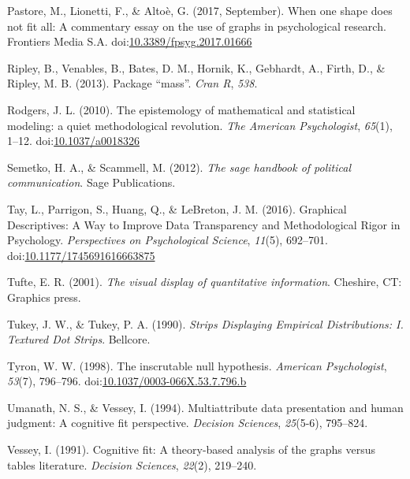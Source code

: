 \documentclass[
  man]{apa6}
\newlength{\cslhangindent}
\newenvironment{cslreferences}%
  {\setlength{\parindent}{0pt}%
  \everypar{\setlength{\hangindent}{\cslhangindent}}\ignorespaces}%
  {\par}
\begin{document}
\begin{cslreferences}
\leavevmode\hypertarget{ref-Pastore2017}{}%
Pastore, M., Lionetti, F., \& Altoè, G. (2017, September). When one shape does not fit all: A commentary essay on the use of graphs in psychological research. Frontiers Media S.A. doi:\href{https://doi.org/10.3389/fpsyg.2017.01666}{10.3389/fpsyg.2017.01666}

\leavevmode\hypertarget{ref-ripley2013package}{}%
Ripley, B., Venables, B., Bates, D. M., Hornik, K., Gebhardt, A., Firth, D., \& Ripley, M. B. (2013). Package ``mass''. \emph{Cran R}, \emph{538}.

\leavevmode\hypertarget{ref-rodgers_epistemology_2010}{}%
Rodgers, J. L. (2010). The epistemology of mathematical and statistical modeling: a quiet methodological revolution. \emph{The American Psychologist}, \emph{65}(1), 1--12. doi:\href{https://doi.org/10.1037/a0018326}{10.1037/a0018326}

\leavevmode\hypertarget{ref-semetko2012sage}{}%
Semetko, H. A., \& Scammell, M. (2012). \emph{The sage handbook of political communication}. Sage Publications.

\leavevmode\hypertarget{ref-Tay2016a}{}%
Tay, L., Parrigon, S., Huang, Q., \& LeBreton, J. M. (2016). Graphical Descriptives: A Way to Improve Data Transparency and Methodological Rigor in Psychology. \emph{Perspectives on Psychological Science}, \emph{11}(5), 692--701. doi:\href{https://doi.org/10.1177/1745691616663875}{10.1177/1745691616663875}

\leavevmode\hypertarget{ref-Tufte2001}{}%
Tufte, E. R. (2001). \emph{The visual display of quantitative information}. Cheshire, CT: Graphics press.

\leavevmode\hypertarget{ref-Tukey1990}{}%
Tukey, J. W., \& Tukey, P. A. (1990). \emph{Strips Displaying Empirical Distributions: I. Textured Dot Strips}. Bellcore.

\leavevmode\hypertarget{ref-Tyron1998}{}%
Tyron, W. W. (1998). The inscrutable null hypothesis. \emph{American Psychologist}, \emph{53}(7), 796--796. doi:\href{https://doi.org/10.1037/0003-066X.53.7.796.b}{10.1037/0003-066X.53.7.796.b}

\leavevmode\hypertarget{ref-umanath1994multiattribute}{}%
Umanath, N. S., \& Vessey, I. (1994). Multiattribute data presentation and human judgment: A cognitive fit perspective. \emph{Decision Sciences}, \emph{25}(5-6), 795--824.

\leavevmode\hypertarget{ref-vessey1991cognitive}{}%
Vessey, I. (1991). Cognitive fit: A theory-based analysis of the graphs versus tables literature. \emph{Decision Sciences}, \emph{22}(2), 219--240.


\end{cslreferences}
\end{document}
